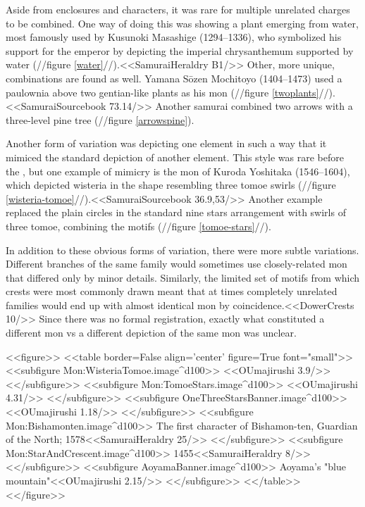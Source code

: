   Aside from enclosures and characters,  it was rare for multiple 
  unrelated charges to be combined.
  One way of doing this was showing a plant emerging from
  water, most famously used by Kusunoki Masashige (1294--1336),
  who symbolized his support for the emperor by depicting the imperial
  chrysanthemum supported by water (//figure \ref{water}//).<<SamuraiHeraldry B1/>>
  Other, more unique, combinations are found as well.
  Yamana S\=ozen Mochitoyo (1404--1473) used a paulownia above two
  gentian-like plants as his mon (//figure \ref{twoplants}//).<<SamuraiSourcebook 73.14/>>  Another samurai combined two arrows with a three-level pine
  tree (//figure \ref{arrowspine}).

  Another form of variation was depicting one element in such a way
  that it mimiced the standard depiction of another element.  This
  style was rare before the \EdoPeriod, but one example of mimicry is
  the mon of Kuroda Yoshitaka (1546--1604), which depicted wisteria in
  the shape resembling three tomoe swirls (//figure
  \ref{wisteria-tomoe}//).<<SamuraiSourcebook 36.9,53/>> Another example
  replaced the plain circles in the standard nine stars arrangement
  with swirls of three tomoe, combining the motifs (//figure
  \ref{tomoe-stars}//).

  In addition to these obvious forms of variation, there were more
  subtle variations.  Different branches of the same family would
  sometimes use closely-related mon that differed only by minor
  details.  Similarly, the limited set of motifs from which crests
  were most commonly drawn meant that at times completely unrelated
  families would end up with almost identical mon by
  coincidence.<<DowerCrests 10/>> Since there was no formal
  registration, exactly what constituted a different mon vs a
  different depiction of the same mon was unclear.

  <<figure>>
  <<table border=False align='center' figure=True font="small">>
  <<subfigure Mon:WisteriaTomoe.image^d100>>
    \label{wisteria-tomoe}<<OUmajirushi 3.9/>>
  <</subfigure>>
  <<subfigure Mon:TomoeStars.image^d100>>
    \label{tomoe-stars}<<OUmajirushi 4.31/>>
  <</subfigure>>
  <<subfigure OneThreeStarsBanner.image^d100>>
    <<OUmajirushi 1.18/>>
  <</subfigure>>
  <<subfigure Mon:Bishamonten.image^d100>>
    \label{bisha}The first character of Bishamon-ten, Guardian of the North; 1578<<SamuraiHeraldry 25/>>
  <</subfigure>>
  <<subfigure Mon:StarAndCrescent.image^d100>>
    \label{chiba}1455<<SamuraiHeraldry 8/>>
  <</subfigure>>
  <<subfigure AoyamaBanner.image^d100>>
    \label{aoyama}Aoyama's "blue mountain"<<OUmajirushi 2.15/>>
  <</subfigure>>
  <</table>>
  <</figure>>  

